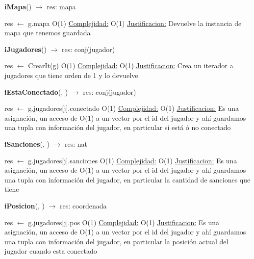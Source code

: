 \begin{Algoritmos}

\begin{algorithm}[H]{\textbf{iMapa}() $\to$ res: mapa}
	\begin{algorithmic}[1]
		\State res $\gets$ g.mapa \Comment O(1)
		\medskip
		\Statex \underline{Complejidad:} O(1)
		\Statex \underline{Justificacion:} Devuelve la instancia de mapa que tenemos guardada
	\end{algorithmic}
\end{algorithm}

\begin{algorithm}[H]{\textbf{iJugadores}() $\to$ res: conj(jugador)}
	\begin{algorithmic}[1]
		\State res $\gets$ CrearIt(g) \Comment O(1)
		\medskip
		\Statex \underline{Complejidad:} O(1)
		\Statex \underline{Justificacion:} Crea un iterador a jugadores que tiene orden de 1 y lo devuelve
	\end{algorithmic}
\end{algorithm}

\begin{algorithm}[H]{\textbf{iEstaConectado}(, ) $\to$ res: conj(jugador)}
	\begin{algorithmic}[1]
		\State res $\gets$ g.jugadores[j].conectado \Comment O(1)
		\medskip
		\Statex \underline{Complejidad:} O(1)
		\Statex \underline{Justificacion:} Es una asignaci\'on, un acceso de O(1) a un vector por el id del jugador y ah\'i guardamos una tupla con informaci\'on del jugador, en particular si est\'a \'o no conectado
	\end{algorithmic}
\end{algorithm}

\begin{algorithm}[H]{\textbf{iSanciones}(, ) $\to$ res: nat}
	\begin{algorithmic}[1]
		\State res $\gets$ g.jugadores[j].sanciones \Comment O(1)
		\medskip
		\Statex \underline{Complejidad:} O(1)
		\Statex \underline{Justificacion:} Es una asignaci\'on, un acceso de O(1) a un vector por el id del jugador y ah\'i guardamos una tupla con informaci\'on del jugador, en particular la cantidad de sanciones que tiene
	\end{algorithmic}
\end{algorithm}

\begin{algorithm}[H]{\textbf{iPosicion}(, ) $\to$ res: coordenada}
	\begin{algorithmic}[1]
		\State res $\gets$ g.jugadores[j].pos \Comment O(1)
		\medskip
		\Statex \underline{Complejidad:} O(1)
		\Statex \underline{Justificacion:} Es una asignaci\'on, un acceso de O(1) a un vector por el id del jugador y ah\'i guardamos una tupla con informaci\'on del jugador, en particular la posici\'on actual del jugador cuando esta conectado
	\end{algorithmic}
\end{algorithm}


\end{Algoritmos}
